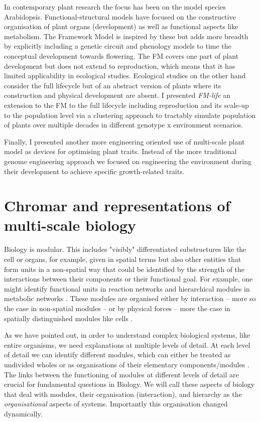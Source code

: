 In contemporary plant research the focus has been on the model species
Arabidopsis. Functional-structural models have focused on the constructive
organisation of plant organs (development) as well as functional aspects like
metabolism. The Framework Model \citep{chew_multiscale_2014} is inspired by
these but adds more breadth by explicitly including a genetic circuit and
phenology models to time the conceptual development towards flowering. The FM
covers one part of plant development but does not extend to reproduction, which
means that it has limited applicability in ecological studies. Ecological
studies on the other hand consider the full lifecycle but of an abstract version
of plants where its construction and physical development are absent. I
presented \emph{FM-life} an extension to the FM to the full lifecycle including
reproduction and its scale-up to the population level via a clustering approach
to tractably simulate population of plants over multiple decades in different
genotype x environment scenarios.

Finally, I presented another more engineering oriented use of multi-scale plant
model as devices for optimising plant traits. Instead of the more traditional
genome engineering approach we focused on engineering the environment during
their development to achieve specific growth-related traits.


\section{Chromar and representations of multi-scale biology}
Biology is modular. This includes "visibly" differentiated substructures like
the cell or organs, for example, given in spatial terms but also other entities
that form units in a non-spatial way that could be identified by the strength of
the interactions between their components or their functional goal. For example,
one might identify functional units in reaction networks
\citep{ederer_approach_2003} and hierarchical modules in metabolic networks
\citep{ravasz_hierarchical_2002}. These modules are organised either by
interaction -- more so the case in non-spatial modules -- or by physical forces
-- more the case in spatially distinguished modules like cells
\citep['Biological and Physical systems' section]{simon1962architecture}.

As we have pointed out, in order to understand complex biological systems, like
entire organisms, we need explanations at multiple levels of detail. At each
level of detail we can identify different modules, which can either be treated
as undivided wholes or as organisations of their elementary components/modules
\citep{varela_autopoiesis:_1974}. The links between the functioning of modules
at different levels of detail are crucial for fundamental questions in
Biology. We will call these aspects of biology that deal with modules, their
organisation (interaction), and hierarchy as the \emph{organisational} aspects
of systems. Importantly this organisation changed dynamically.

